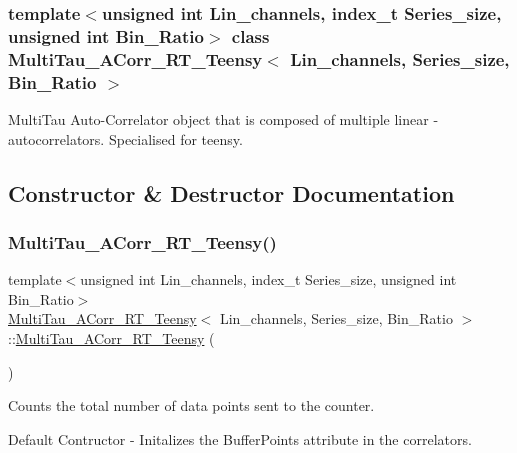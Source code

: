 \subsubsection*{template$<$unsigned int Lin\+\_\+channels, index\+\_\+t Series\+\_\+size, unsigned int Bin\+\_\+\+Ratio$>$\newline
class Multi\+Tau\+\_\+\+A\+Corr\+\_\+\+R\+T\+\_\+\+Teensy$<$ Lin\+\_\+channels, Series\+\_\+size, Bin\+\_\+\+Ratio $>$}

Multi\+Tau Auto-\/\+Correlator object that is composed of multiple linear -\/ autocorrelators. Specialised for teensy. 

\subsection{Constructor \& Destructor Documentation}
\mbox{\label{classMultiTau__ACorr__RT__Teensy_a28cfdcd7468aac93693a4d4803fc95f9}} 
\subsubsection{\texorpdfstring{Multi\+Tau\+\_\+\+A\+Corr\+\_\+\+R\+T\+\_\+\+Teensy()}{MultiTau\_ACorr\_RT\_Teensy()}}
{\footnotesize\ttfamily template$<$unsigned int Lin\+\_\+channels, index\+\_\+t Series\+\_\+size, unsigned int Bin\+\_\+\+Ratio$>$ \\
\hyperlink{classMultiTau__ACorr__RT__Teensy}{Multi\+Tau\+\_\+\+A\+Corr\+\_\+\+R\+T\+\_\+\+Teensy}$<$ Lin\+\_\+channels, Series\+\_\+size, Bin\+\_\+\+Ratio $>$\+::\hyperlink{classMultiTau__ACorr__RT__Teensy}{Multi\+Tau\+\_\+\+A\+Corr\+\_\+\+R\+T\+\_\+\+Teensy} (\begin{DoxyParamCaption}{ }\end{DoxyParamCaption})\hspace{0.3cm}{\ttfamily [inline]}}



Counts the total number of data points sent to the counter. 

Default Contructor -\/ Initalizes the Buffer\+Points attribute in the correlators. 

